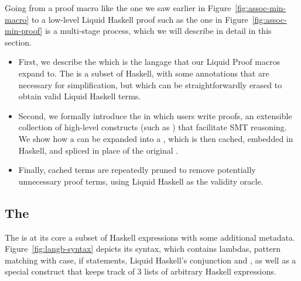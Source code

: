 % 
% 
  

Going from a proof macro like the one we saw earlier in
Figure~\ref{fig:assoc-min-macro} to a low-level Liquid Haskell proof
such as the one in Figure~\ref{fig:assoc-min-proof} is a
multi-stage process, which we will describe in detail in this section.

\begin{itemize}
\item First, we describe the \LangB which is the langage that our Liquid
  Proof macros expand to. The \LangB is a subset of Haskell, with some
  annotations that are necessary for simplification, but which can
  be straightforwardly erased to obtain valid Liquid Haskell terms.
\item Second, we formally introduce the \LangA in which users write
  proofs, an extensible collection of high-level constructs (such as
  ) that facilitate SMT reasoning. We show how a \LangATerm can be
  expanded into a \LangBTerm, which is then cached, embedded in Haskell,
  and spliced in place of the original \LangATerm.
\item Finally, cached terms are repeatedly pruned to remove
  potentially unnecessary proof terms, using Liquid Haskell as the
  validity oracle.
  
\end{itemize}

\subsection{The \LangB}
\label{sec:proto-proof}

The \LangB is at its core a subset of Haskell expressions with some
additional metadata.  Figure~\ref{fig:langb-syntax} depicts its
syntax, which contains lambdas, pattern matching with case, if
statements, Liquid Haskell's conjunction \LC{&&&} and , as
well as a special construct  that keeps track of 3 lists of
arbitrary Haskell expressions. 



